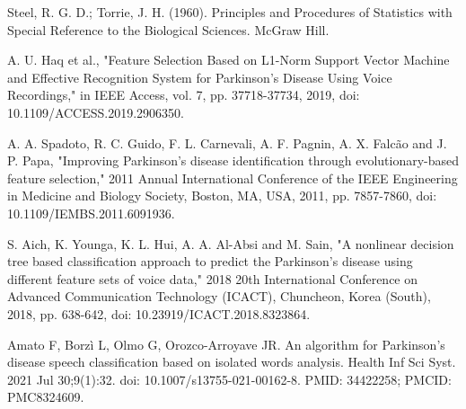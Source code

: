 \begin{thebibliography}{00}
 Steel, R. G. D.; Torrie, J. H. (1960). Principles and Procedures of Statistics with Special Reference to the Biological Sciences. McGraw Hill.

 A. U. Haq et al., "Feature Selection Based on L1-Norm Support Vector Machine and Effective Recognition System for Parkinson’s Disease Using Voice Recordings," in IEEE Access, vol. 7, pp. 37718-37734, 2019, doi: 10.1109/ACCESS.2019.2906350.

 A. A. Spadoto, R. C. Guido, F. L. Carnevali, A. F. Pagnin, A. X. Falcão and J. P. Papa, "Improving Parkinson's disease identification through evolutionary-based feature selection," 2011 Annual International Conference of the IEEE Engineering in Medicine and Biology Society, Boston, MA, USA, 2011, pp. 7857-7860, doi: 10.1109/IEMBS.2011.6091936.

 S. Aich, K. Younga, K. L. Hui, A. A. Al-Absi and M. Sain, "A nonlinear decision tree based classification approach to predict the Parkinson's disease using different feature sets of voice data," 2018 20th International Conference on Advanced Communication Technology (ICACT), Chuncheon, Korea (South), 2018, pp. 638-642, doi: 10.23919/ICACT.2018.8323864.

 Amato F, Borzì L, Olmo G, Orozco-Arroyave JR. An algorithm for Parkinson's disease speech classification based on isolated words analysis. Health Inf Sci Syst. 2021 Jul 30;9(1):32. doi: 10.1007/s13755-021-00162-8. PMID: 34422258; PMCID: PMC8324609.





\end{thebibliography}

